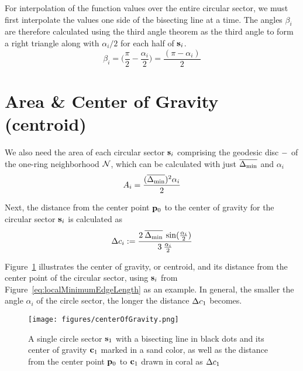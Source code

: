 For interpolation of the function values over the entire circular sector, we must first interpolate the values one side of the bisecting line at a time. The angles $\beta_i$ are therefore calculated using the third angle theorem as the third angle to form a right triangle along with $\alpha_i/2$ for each half of $\mathbf{s}_i$. 
\begin{equation}
	\beta_i = \Big(\frac{\pi}{2} - \frac{\alpha_i}{2}\Big) = \frac{(\pi - \alpha_i)}{2}
	\label{eq:betaFromHalfAlpha}
\end{equation}%
%
%
\section{Area \& Center of Gravity (centroid)} 
We also need the area of each circular sector $\mathbf{s}_i$ comprising the geodesic disc $\mathcal{\Gamma}$ of the one-ring neighborhood $\mathcal{N}$, which can be calculated with just $\overline{\Delta_\text{min}}$ and $\alpha_i$
\begin{equation}
	A_i = \frac{(\overline{\Delta_\text{min}})^2\alpha_i}{2}
	\label{eq:circularSectorArea}
\end{equation}
%
%

Next, the distance from the center point $\mathbf{p}_0$ to the center of gravity for the circular sector $\mathbf{s}_i$ is calculated as
\begin{equation}
	\Delta c_i := \frac{2\:\overline{\Delta_\text{min}}\:\sin(\frac{\alpha_i}{2})}{3\:\frac{\alpha_i}{2}}
	\label{eq:distToCoG}
\end{equation}
%
%

Figure~\ref{fig:centerOfGravity} illustrates the center of gravity, or centroid,  and its distance from the center point of the circular sector, using $\mathbf{s}_i$ from Figure~\ref{eq:localMinimumEdgeLength} as an example. In general, the smaller the angle $\alpha_i$ of the circle sector, the longer the distance $\Delta c_1$ becomes.
\begin{figure}[ht]
\ffigbox
	{\texttt{[image: figures/centerOfGravity.png]}}
	{\caption[Distance to and Center of Gravity]{A single circle sector $\mathbf{s}_1$ with a bisecting line in black dots and its center of gravity $\mathbf{c}_1$ marked in a sand color, as well as the distance from the center point $\mathbf{p}_0$ to $\mathbf{c}_1$ drawn in coral as $\Delta c_1$}\label{fig:centerOfGravity}}
\end{figure}%
%
%
